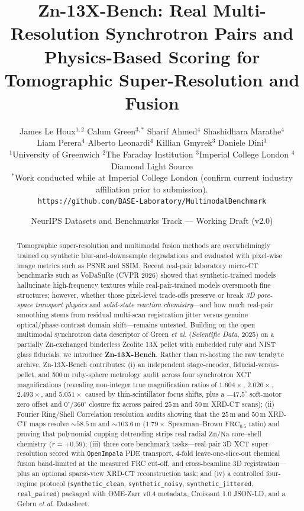 \documentclass[10pt]{article}
\title{\textbf{Zn-13X-Bench: Real Multi-Resolution Synchrotron Pairs and Physics-Based Scoring for Tomographic Super-Resolution and Fusion}}
\author{
  James Le Houx$^{1,2}$ \quad Calum Green$^{3,\ast}$ \quad Sharif Ahmed$^{4}$ \quad Shashidhara Marathe$^{4}$ \\
  Liam Perera$^{4}$ \quad Alberto Leonardi$^{4}$ \quad Killian Gmyrek$^{3}$ \quad Daniele Dini$^{3}$ \\[3pt]
  \small $^{1}$University of Greenwich \quad $^{2}$The Faraday Institution \quad $^{3}$Imperial College London \quad $^{4}$Diamond Light Source \\
  \footnotesize $^{\ast}$Work conducted while at Imperial College London (confirm current industry affiliation prior to submission). \\
  \small \texttt{https://github.com/BASE-Laboratory/MultimodalBenchmark}
}
\date{NeurIPS Datasets and Benchmarks Track --- Working Draft (v2.0)}
\begin{document}
\maketitle

\begin{abstract}
Tomographic super-resolution and multimodal fusion methods are overwhelmingly trained on synthetic blur-and-downsample degradations and evaluated with pixel-wise image metrics such as PSNR and SSIM. Recent real-pair laboratory micro-CT benchmarks such as VoDaSuRe (CVPR 2026) showed that synthetic-trained models hallucinate high-frequency textures while real-pair-trained models oversmooth fine structures; however, whether those pixel-level trade-offs preserve or break \emph{3D pore-space transport physics} and \emph{solid-state reaction chemistry}---and how much real-pair smoothing stems from residual multi-scan registration jitter versus genuine optical/phase-contrast domain shift---remains untested. Building on the open multimodal synchrotron data descriptor of Green \emph{et al.} (\emph{Scientific Data}, 2025) on a partially Zn-exchanged binderless Zeolite 13X pellet with embedded ruby and NIST glass fiducials, we introduce \textbf{Zn-13X-Bench}. Rather than re-hosting the raw terabyte archive, Zn-13X-Bench contributes: (i) an independent stage-encoder, fiducial-versus-pellet, and 500\,\textmu m ruby-sphere metrology audit across four synchrotron XCT magnifications (revealing non-integer true magnification ratios of $1.604\times$, $2.026\times$, $2.493\times$, and $5.051\times$ caused by thin-scintillator focus shifts, plus a $-47.5^\circ$ soft-motor zero offset and $0^\circ/360^\circ$ closure fix across paired $25$\,\textmu m and $50$\,\textmu m XRD-CT scans); (ii) Fourier Ring/Shell Correlation resolution audits showing that the $25$\,\textmu m and $50$\,\textmu m XRD-CT maps resolve $\sim 58.5$\,\textmu m and $\sim 103.6$\,\textmu m ($1.79\times$ Spearman--Brown $\mathrm{FRC}_{0.5}$ ratio) and proving that polynomial cupping detrending strips real radial $\mathrm{Zn/Na}$ core--shell chemistry ($r = +0.59$); (iii) three core benchmark tasks---real-pair 3D XCT super-resolution scored with \texttt{OpenImpala} PDE transport, 4-fold leave-one-slice-out chemical fusion band-limited at the measured FRC cut-off, and cross-beamline 3D registration---plus an optional sparse-view XRD-CT reconstruction task; and (iv) a controlled four-regime protocol (\texttt{synthetic\_clean}, \texttt{synthetic\_noisy}, \texttt{synthetic\_jittered}, \texttt{real\_paired}) packaged with OME-Zarr v0.4 metadata, Croissant 1.0 JSON-LD, and a Gebru \emph{et al.} Datasheet.
\end{abstract}
\end{document}
